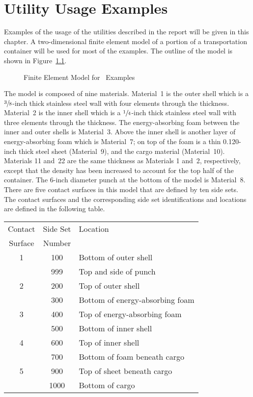 \chapter{Utility Usage Examples}\label{c:examples}

Examples of the usage of the utilities described in the report will be
given in this chapter.  A two-dimensional finite element model of a
portion of a transportation container will be used for most of the
examples.  The outline of the model is shown in Figure~\ref{exmodel}.
\begin{figure}
\vspace{5.0in}
\caption{Finite Element Model for \numbers\ Examples}\label{exmodel}
\end{figure}
The model is composed of nine materials.  Material~1 is the outer shell
which is a $\sfrac{3}{8}$-inch thick stainless steel wall with four
elements through the thickness.  Material~2 is the inner shell which is
a $\sfrac{1}{4}$-inch thick stainless steel wall with three elements
through the thickness.  The energy-absorbing foam between the inner and
outer shells is Material~3.  Above the inner shell is another layer of
energy-absorbing foam which is Material~7;  on top of the foam is a thin
0.120-inch thick steel sheet (Material~9), and the cargo material
(Material~10).  Materials 11 and~22 are the same thickness as Materials
1 and~2, respectively, except that the density has been increased to
account for the top half of the container.  The 6-inch diameter punch at
the bottom of the model is Material~8.  There are five contact surfaces
in this model that are defined by ten side sets.  The contact surfaces
and the corresponding side set identifications and locations are defined
in the following table.

\begin{center}
\begin{tabular}{|ccl|}\hline
Contact  & Side Set  &  Location \\
Surface  & Number    &            \\ \hline \hline
      1  &  100      &  Bottom of outer shell \\
         &  999      &  Top and side of punch      \\ \hline
      2  &  200      &  Top of outer shell    \\
         &  300      &  Bottom of energy-absorbing foam  \\ \hline
      3  &  400      &  Top of energy-absorbing foam  \\
         &  500      &  Bottom of inner shell         \\ \hline
      4  &  600      &  Top of inner shell \\
         &  700      &  Bottom of foam beneath cargo  \\ \hline
      5  &  900      &  Top of sheet beneath cargo \\
         & 1000      &  Bottom of cargo   \\ \hline
\end{tabular}
\end{center}

